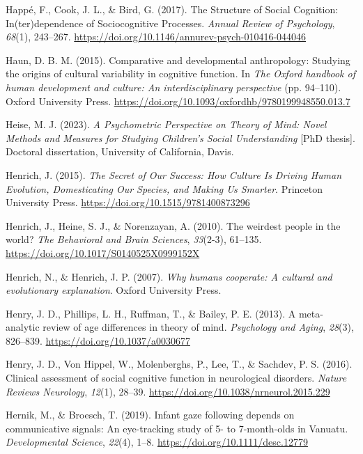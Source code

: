 \documentclass[
]{scrbook}
\newlength{\cslhangindent}
\newenvironment{CSLReferences}[2] %
 {\begin{list}{}{%
  \setlength{\itemindent}{0pt}
  \setlength{\leftmargin}{0pt}
  \setlength{\parsep}{0pt}
  \ifodd #1
   \setlength{\leftmargin}{\cslhangindent}
   \setlength{\itemindent}{-1\cslhangindent}
  \fi
  \setlength{\itemsep}{#2\baselineskip}}}
 {\end{list}}
\begin{document}
\begin{CSLReferences}{1}{0}
Happé, F., Cook, J. L., \& Bird, G. (2017). The {Structure} of {Social Cognition}: {In}(ter)dependence of {Sociocognitive Processes}. \emph{Annual Review of Psychology}, \emph{68}(1), 243--267. \url{https://doi.org/10.1146/annurev-psych-010416-044046}

Haun, D. B. M. (2015). Comparative and developmental anthropology: {Studying} the origins of cultural variability in cognitive function. In \emph{The {Oxford} handbook of human development and culture: {An} interdisciplinary perspective} (pp. 94--110). Oxford University Press. \url{https://doi.org/10.1093/oxfordhb/9780199948550.013.7}

Heise, M. J. (2023). \emph{A {Psychometric Perspective} on {Theory} of {Mind}: {Novel Methods} and {Measures} for {Studying Children}'s {Social Understanding}} {[}PhD thesis{]}. Doctoral dissertation, University of California, Davis.

Henrich, J. (2015). \emph{The {Secret} of {Our Success}: {How Culture Is Driving Human Evolution}, {Domesticating Our Species}, and {Making Us Smarter}}. Princeton University Press. \url{https://doi.org/10.1515/9781400873296}

Henrich, J., Heine, S. J., \& Norenzayan, A. (2010). The weirdest people in the world? \emph{The Behavioral and Brain Sciences}, \emph{33}(2-3), 61--135. \url{https://doi.org/10.1017/S0140525X0999152X}

Henrich, N., \& Henrich, J. P. (2007). \emph{Why humans cooperate: {A} cultural and evolutionary explanation}. Oxford University Press.

Henry, J. D., Phillips, L. H., Ruffman, T., \& Bailey, P. E. (2013). A meta-analytic review of age differences in theory of mind. \emph{Psychology and Aging}, \emph{28}(3), 826--839. \url{https://doi.org/10.1037/a0030677}

Henry, J. D., Von Hippel, W., Molenberghs, P., Lee, T., \& Sachdev, P. S. (2016). Clinical assessment of social cognitive function in neurological disorders. \emph{Nature Reviews Neurology}, \emph{12}(1), 28--39. \url{https://doi.org/10.1038/nrneurol.2015.229}

Hernik, M., \& Broesch, T. (2019). Infant gaze following depends on communicative signals: {An} eye-tracking study of 5- to 7-month-olds in {Vanuatu}. \emph{Developmental Science}, \emph{22}(4), 1--8. \url{https://doi.org/10.1111/desc.12779}


\end{CSLReferences}
\end{document}
